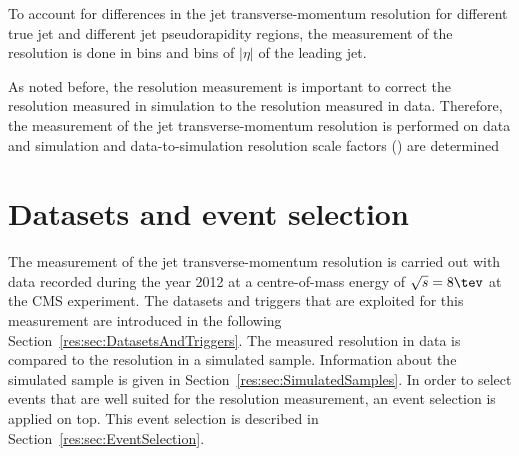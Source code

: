 To account for differences in the jet transverse-momentum resolution for different true jet \pt and different jet pseudorapidity regions, the measurement of the resolution is done in \ptgamma bins and bins of $|\eta|$ of the leading jet.

As noted before, the resolution measurement is important to correct the resolution measured in simulation to the resolution measured in data.
Therefore, the measurement of the jet transverse-momentum resolution is performed on data and simulation and data-to-simulation resolution scale factors (\rhores) are determined
\FloatBarrier
\chapter{Datasets and event selection}

The measurement of the jet transverse-momentum resolution is carried out with \GAMJET data recorded during the year 2012 at a centre-of-mass energy of $\sqrt{s}=8\tev$ at the CMS experiment.
The datasets and triggers that are exploited for this measurement are introduced in the following Section~\ref{res:sec:DatasetsAndTriggers}.
The measured resolution in data is compared to the resolution in a simulated \GAMJET sample. %
Information about the simulated sample is given in Section~\ref{res:sec:SimulatedSamples}.
In order to select \GAMJET events that are well suited for the resolution measurement, an event selection is applied on top.
This event selection is described in Section~\ref{res:sec:EventSelection}.

